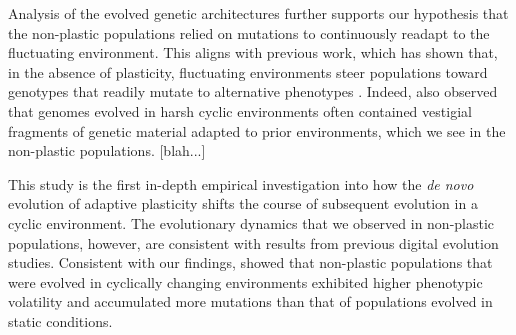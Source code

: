 Analysis of the evolved genetic architectures further supports our hypothesis that the non-plastic populations relied on mutations to continuously readapt to the fluctuating environment. 
This aligns with previous work, which has shown that, in the absence of plasticity, fluctuating environments steer populations toward genotypes that readily mutate to alternative phenotypes \cite{lalejini_evolutionary_2016, canino-koning_evolution_2016}.
Indeed, \cite{canino-koning_evolution_2016} also observed that genomes evolved in harsh cyclic environments often contained vestigial fragments of genetic material adapted to prior environments, which we see in the non-plastic populations. 
[blah...]


This study is the first in-depth empirical investigation into how the \textit{de novo} evolution of adaptive plasticity shifts the course of subsequent evolution in a cyclic environment.
The evolutionary dynamics that we observed in non-plastic populations, however, are consistent with results from previous digital evolution studies. 
Consistent with our findings, \cite{dolson_interpreting_2020} showed that non-plastic populations that were evolved in cyclically changing environments exhibited higher phenotypic volatility and accumulated more mutations than that of populations evolved in static conditions.

